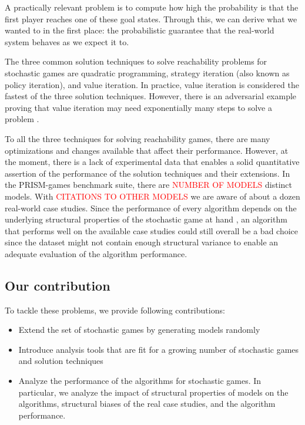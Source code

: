 A practically relevant problem is to compute how high the probability is that the first player reaches one of these goal states. 
Through this, we can derive what we wanted to in the first place: 
the probabilistic guarantee that the real-world system behaves as we expect it to.

The three common solution techniques to solve reachability problems for stochastic games are quadratic programming, 
strategy iteration (also known as policy iteration), and value iteration.
In practice, value iteration is considered the fastest of the three solution techniques.
However, there is an adversarial example proving that value iteration may need exponentially many steps to solve a problem \cite{viExponential}.


To all the three techniques for solving reachability games, there are many optimizations and changes available that affect their performance.
However, at the moment, there is a lack of experimental data that enables a solid quantitative assertion of the performance of the solution techniques and their extensions.
In the PRISM-games benchmark suite, there are \textcolor{red}{NUMBER OF MODELS} distinct models. 
With \textcolor{red}{CITATIONS TO OTHER MODELS} we are aware of about a dozen real-world case studies.
Since the performance of every algorithm depends on the underlying structural properties of the stochastic game at hand \cite{gandalf}, 
an algorithm that performs well on the available case studies could still overall be a bad choice since the dataset might not contain enough
structural variance to enable an adequate evaluation of the algorithm performance.

\subsection*{Our contribution}
To tackle these problems, we provide following contributions:
\begin{itemize}
    \item Extend the set of stochastic games by generating models randomly
    \item Introduce analysis tools that are fit for a growing number of stochastic games and solution techniques
    \item Analyze the performance of the algorithms for stochastic games. 
        In particular, we analyze the impact of structural properties of models on the algorithms, structural biases of the real case studies, and the algorithm performance.
\end{itemize}

